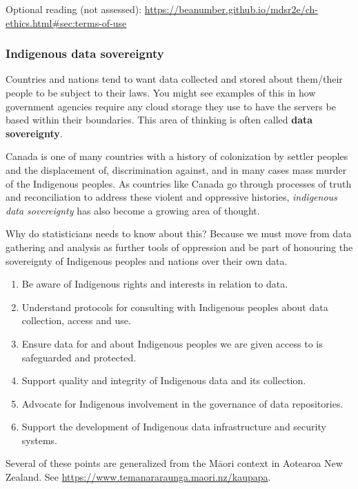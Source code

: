 \documentclass[
  openany]{book}
\providecommand{\tightlist}{%
  \setlength{\itemsep}{0pt}\setlength{\parskip}{0pt}}
\begin{document}
Optional reading (not assessed): \url{https://beanumber.github.io/mdsr2e/ch-ethics.html\#sec:terms-of-use}

\hypertarget{indigenous-data-sovereignty}{%
\subsubsection{Indigenous data sovereignty}\label{indigenous-data-sovereignty}}

Countries and nations tend to want data collected and stored about them/their people to be subject to their laws. You might see examples of this in how government agencies require any cloud storage they use to have the servers be based within their boundaries. This area of thinking is often called \textbf{data sovereignty}.

Canada is one of many countries with a history of colonization by settler peoples and the displacement of, discrimination against, and in many cases mass murder of the Indigenous peoples. As countries like Canada go through processes of truth and reconciliation to address these violent and oppressive histories, \emph{indigenous data sovereignty} has also become a growing area of thought.

Why do statisticians needs to know about this? Because we must move from data gathering and analysis as further tools of oppression and be part of honouring the sovereignty of Indigenous peoples and nations over their own data.

\begin{enumerate}
\def\labelenumi{\arabic{enumi}.}
\tightlist
\item
  Be aware of Indigenous rights and interests in relation to data.
\item
  Understand protocols for consulting with Indigenous peoples about data collection, access and use.
\item
  Ensure data for and about Indigenous peoples we are given access to is safeguarded and protected.
\item
  Support quality and integrity of Indigenous data and its collection.
\item
  Advocate for Indigenous involvement in the governance of data repositories.
\item
  Support the development of Indigenous data infrastructure and security systems.
\end{enumerate}

Several of these points are generalized from the Māori context in Aotearoa New Zealand. See \url{https://www.temanararaunga.maori.nz/kaupapa}.
\end{document}
